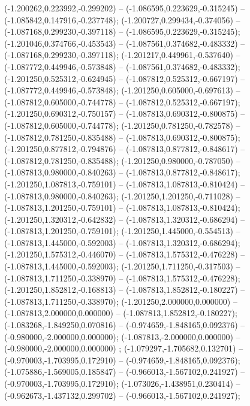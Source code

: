  (-1.200262,0.223992,-0.299202) -- (-1.086595,0.223629,-0.315245) -- (-1.085842,0.147916,-0.237748);
 (-1.200727,0.299434,-0.374056) -- (-1.087168,0.299230,-0.397118) -- (-1.086595,0.223629,-0.315245);
 (-1.201046,0.374766,-0.453543) -- (-1.087561,0.374682,-0.483332) -- (-1.087168,0.299230,-0.397118);
 (-1.201217,0.449961,-0.537640) -- (-1.087772,0.449946,-0.573848) -- (-1.087561,0.374682,-0.483332);
 (-1.201250,0.525312,-0.624945) -- (-1.087812,0.525312,-0.667197) -- (-1.087772,0.449946,-0.573848);
 (-1.201250,0.605000,-0.697613) -- (-1.087812,0.605000,-0.744778) -- (-1.087812,0.525312,-0.667197);
 (-1.201250,0.690312,-0.750157) -- (-1.087813,0.690312,-0.800875) -- (-1.087812,0.605000,-0.744778);
 (-1.201250,0.781250,-0.782578) -- (-1.087812,0.781250,-0.835488) -- (-1.087813,0.690312,-0.800875);
 (-1.201250,0.877812,-0.794876) -- (-1.087813,0.877812,-0.848617) -- (-1.087812,0.781250,-0.835488);
 (-1.201250,0.980000,-0.787050) -- (-1.087813,0.980000,-0.840263) -- (-1.087813,0.877812,-0.848617);
 (-1.201250,1.087813,-0.759101) -- (-1.087813,1.087813,-0.810424) -- (-1.087813,0.980000,-0.840263);
 (-1.201250,1.201250,-0.711028) -- (-1.087813,1.201250,-0.759101) -- (-1.087813,1.087813,-0.810424);
 (-1.201250,1.320312,-0.642832) -- (-1.087813,1.320312,-0.686294) -- (-1.087813,1.201250,-0.759101);
 (-1.201250,1.445000,-0.554513) -- (-1.087813,1.445000,-0.592003) -- (-1.087813,1.320312,-0.686294);
 (-1.201250,1.575312,-0.446070) -- (-1.087813,1.575312,-0.476228) -- (-1.087813,1.445000,-0.592003);
 (-1.201250,1.711250,-0.317503) -- (-1.087813,1.711250,-0.338970) -- (-1.087813,1.575312,-0.476228);
 (-1.201250,1.852812,-0.168813) -- (-1.087813,1.852812,-0.180227) -- (-1.087813,1.711250,-0.338970);
 (-1.201250,2.000000,0.000000) -- (-1.087813,2.000000,0.000000) -- (-1.087813,1.852812,-0.180227);
 (-1.083268,-1.849250,0.070816) -- (-0.974659,-1.848165,0.092376) -- (-0.980000,-2.000000,0.000000);
 (-1.087813,-2.000000,0.000000) -- (-0.980000,-2.000000,0.000000) ;
 (-1.079297,-1.705682,0.132701) -- (-0.970003,-1.703995,0.172910) -- (-0.974659,-1.848165,0.092376);
 (-1.075886,-1.569005,0.185847) -- (-0.966013,-1.567102,0.241927) -- (-0.970003,-1.703995,0.172910);
 (-1.073026,-1.438951,0.230414) -- (-0.962673,-1.437132,0.299702) -- (-0.966013,-1.567102,0.241927);
